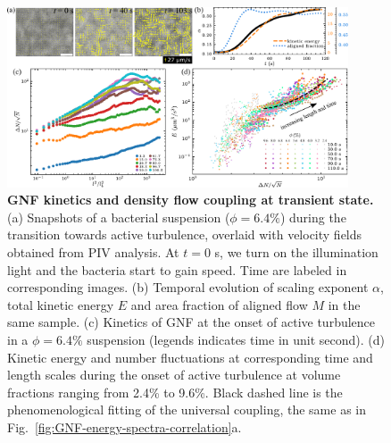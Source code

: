 \documentclass[twocolumn,aps,prx,amsmath,amssymb,longbibliography]{revtex4-2}
\begin{document}
\begin{figure}[t]
\begin{center}
\includegraphics[width=0.9\textwidth]{figures/GNF-energy-spectra-correlation-transient/v6.pdf}
\caption[The correlation between GNF and kinetic energy and kinetic energy spectra at transient state]
{
\textbf{GNF kinetics and density flow coupling at transient state.}
(a) Snapshots of a bacterial suspension ($\phi=6.4\%$) during the transition towards active turbulence, overlaid with velocity fields obtained from PIV analysis. At $t=0$ s, we turn on the illumination light and the bacteria start to gain speed. Time are labeled in corresponding images.
(b) Temporal evolution of scaling exponent $\alpha$, total kinetic energy $E$ and area fraction of aligned flow $M$ in the same sample.
(c) Kinetics of GNF at the onset of active turbulence in a $\phi=6.4\%$ suspension (legends indicates time in unit second).
(d) Kinetic energy and number fluctuations at corresponding time and length scales during the onset of active turbulence at volume fractions ranging from 2.4\% to 9.6\%. Black dashed line is the phenomenological fitting of the universal coupling, the same as in Fig.~\ref{fig:GNF-energy-spectra-correlation}a.
}
\label{fig:GNF-energy-spectra-correlation-transient}
\end{center}
\end{figure}
\end{document}
